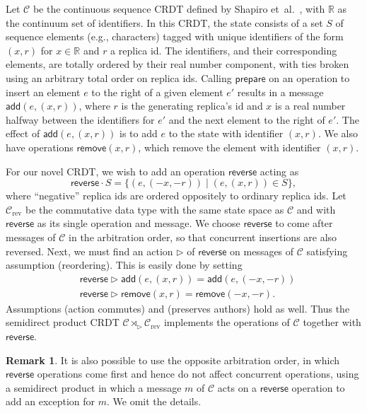 \documentclass[acmsmall,nonacm,12pt]{acmart}
\newcommand{\mc}[1]{\ensuremath{\mathcal{#1}}}
\newcommand{\mb}[1]{\ensuremath{\mathbb{#1}}}
\newcommand{\msf}[1]{\ensuremath{\mathsf{#1}}}
\newcommand{\act}{\triangleright}
\newcommand{\R}{\mb{R}}
\theoremstyle{plain}
\theoremstyle{definition}
\newtheorem{myrmk}[mythm]{Remark}
\begin{document}
Let $\mc{C}$ be the continuous sequence CRDT defined by Shapiro et~al.\ \cite[\S 3.5.2]{crdt_survey_2011}, with $\R$ as the continuum set of identifiers.  In this CRDT, the state consists of a set $S$ of sequence elements (e.g., characters) tagged with unique identifiers of the form $(x, r)$ for $x \in \R$ and $r$ a replica id.  The identifiers, and their corresponding elements, are totally ordered by their real number component, with ties broken using an arbitrary total order on replica ids.  Calling $\msf{prepare}$ on an operation to insert an element $e$ to the right of a given element $e'$ results in a message $\msf{add}(e, (x, r))$, where $r$ is the generating replica's id and $x$ is a real number halfway between the identifiers for $e'$ and the next element to the right of $e'$.  The effect of $\msf{add}(e, (x, r))$ is to add $e$ to the state with identifier $(x, r)$.  We also have operations $\msf{remove}(x, r)$, which remove the element with identifier $(x, r)$.

For our novel CRDT, we wish to add an operation $\msf{reverse}$ acting as
\[
\msf{reverse} \cdot S = \{(e, (-x, -r)) \mid (e, (x, r)) \in S\},
\]
where ``negative'' replica ids are ordered oppositely to ordinary replica ids.
Let $\mc{C}_{\text{rev}}$ be the commutative data type with the same state space as $\mc{C}$ and with $\msf{reverse}$ as its single operation and message.  We choose $\msf{reverse}$ to come after messages of $\mc{C}$ in the arbitration order, so that concurrent insertions are also reversed.  Next, we must find an action $\act$ of $\msf{reverse}$ on messages of $\mc{C}$ satisfying assumption (reordering).  This is easily done by setting
\begin{align*}
&\msf{reverse} \act \msf{add}(e, (x, r)) = \msf{add}(e, (-x, -r)) \\
&\msf{reverse} \act \msf{remove}(x, r) = \msf{remove}(-x, -r).
\end{align*}
Assumptions (action commutes) and (preserves authors) hold as well.
Thus the semidirect product CRDT $\mc{C} \rtimes_\act \mc{C}_{\text{rev}}$ implements the operations of $\mc{C}$ together with $\msf{reverse}$.

\begin{myrmk}
It is also possible to use the opposite arbitration order, in which $\msf{reverse}$ operations come first and hence do not affect concurrent operations, using a semidirect product in which a message $m$ of $\mc{C}$ acts on a $\msf{reverse}$ operation to add an exception for $m$.  We omit the details.
\end{myrmk}
\end{document}
